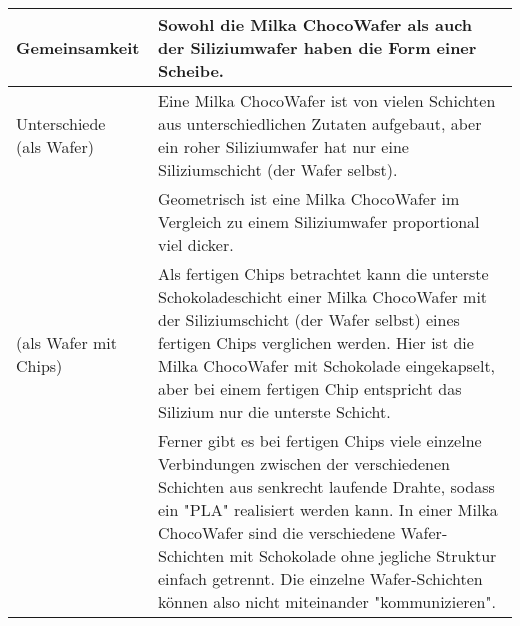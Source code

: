 \begin{enumerate}[label={[OH\arabic*]},start=3]
\begin{center}
        \end{center}
    \newpage
    \item \blanko
        \begin{center}
            \renewcommand*{\arraystretch}{1.6}
            \begin{tabular}{lp{9cm}}
                \toprule
                Gemeinsamkeit & Sowohl die Milka ChocoWafer als auch der Siliziumwafer haben die Form einer Scheibe. \\
                \midrule
                \makecell[bl]{Unterschiede \\ (als Wafer)} &  Eine Milka ChocoWafer ist von vielen Schichten aus unterschiedlichen Zutaten aufgebaut, aber ein roher Siliziumwafer hat nur eine Siliziumschicht (der Wafer selbst). \\
                & Geometrisch ist eine Milka ChocoWafer im Vergleich zu einem Siliziumwafer proportional viel dicker. \\
                \makecell[bl]{ \\ (als Wafer mit Chips)} & Als fertigen Chips betrachtet kann die unterste Schokoladeschicht einer Milka ChocoWafer mit der Siliziumschicht (der Wafer selbst) eines fertigen Chips verglichen werden. Hier ist die Milka ChocoWafer mit Schokolade eingekapselt, aber bei einem fertigen Chip entspricht das Silizium nur die unterste Schicht.\\
                & Ferner gibt es bei fertigen Chips viele einzelne Verbindungen zwischen der verschiedenen Schichten aus senkrecht laufende Drahte, sodass ein "PLA" realisiert werden kann. In einer Milka ChocoWafer sind die verschiedene Wafer-Schichten mit Schokolade ohne jegliche Struktur einfach getrennt. Die einzelne Wafer-Schichten können also nicht miteinander "kommunizieren". \\
                \bottomrule
            \end{tabular}
        \end{center}
        \vspace{\baselineskip}
\end{enumerate}